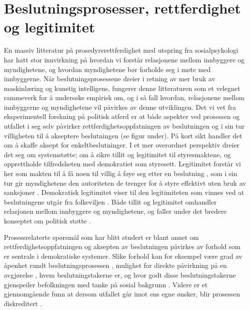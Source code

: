 \documentclass[
]{book}
\begin{document}
\hypertarget{beslutningsprosesser-rettferdighet-og-legitimitet}{%
\section{Beslutningsprosesser, rettferdighet og legitimitet}\label{beslutningsprosesser-rettferdighet-og-legitimitet}}

En massiv litteratur på prosedyrerettferdighet med utspring fra sosialpsykologi \citep{lind1988social} har hatt stor innvirkning på hvordan vi forstår relasjonene mellom innbyggere og myndighetene, og hvordan myndighetene bør forholde seg i møte med innbyggerne.
Når beslutningsprosessene dreier i retning av mer bruk av maskinlæring og kunstig intelligens, fungerer denne litteraturen som et velegnet rammeverk for å undersøke empirisk om, og i så fall hvordan, relasjonene mellom innbyggerne og myndighetene vil påvirkes av denne utviklingen.
Det vi vet fra eksperimentell forskning på politisk atferd er at både aspekter ved prosessen og utfallet i seg selv påvirker rettferdighetsoppfatningen av beslutningen og i sin tur villigheten til å akseptere beslutningen (se figur under).
På kort sikt handler det om å skaffe aksept for enkeltbeslutninger.
I et mer overordnet perspektiv dreier det seg om systemstøtte; om å sikre tillit og legitimitet til styresmaktene, og opprettholde tilfredsheten med demokratiet som styresett.
Legitimitet forstår vi her som makten til å få noen til villig å føye seg etter en beslutning \citep{weber2009theory}, som i sin tur gir myndighetene den autoriteten de trenger for å styre effektivt uten bruk av sanksjoner \citep{tyler2021people}.
Demokratisk legitimitet viser til den legitimiteten som vinnes ved at beslutningene utgår fra folkeviljen \citep{rosanvallon2011democratic}.
Både tillit og legitimitet omhandler relasjonen mellom innbyggere og myndighetene, og faller under det bredere konseptet om politisk støtte \citep{easton1965systems}.

Prosessrelaterte spørsmål som har blitt studert er blant annet om rettferdighetsoppfatningen og aksepten av beslutningen påvirkes av forhold som er sentrale i demokratiske systemer.
Slike forhold kan for eksempel være grad av åpenhet rundt beslutningsprosessen \citep{de2014does}, mulighet for direkte påvirkning på en avgjørelse \citep{EJPR:EJPR2052, arnesen2017legitimacy, christensen2020matter}, hvem beslutningstakerne er, og hvor godt disse beslutningstakerne gjenspeiler befolkningen med tanke på sosial bakgrunn \citep{arnesen2018legitimacy, clayton2019all}.
Videre er et gjennomgående funn at dersom utfallet går imot ens egne ønsker, blir prosessen diskreditert \citep{esaiasson2016reconsidering}.
\end{document}
